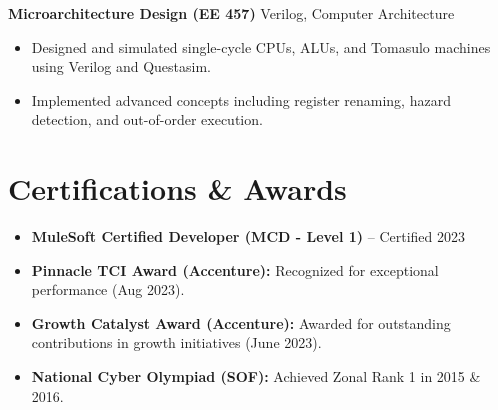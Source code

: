 \documentclass[letterpaper,10pt]{article}
\begin{document}
    \vspace{-2pt}
    \textbf{Microarchitecture Design (EE 457)} \hfill Verilog, Computer Architecture
    \begin{itemize}[leftmargin=*]
        \item Designed and simulated single-cycle CPUs, ALUs, and Tomasulo machines using Verilog and Questasim.
        \item Implemented advanced concepts including register renaming, hazard detection, and out-of-order execution.
    \end{itemize}

\section*{Certifications \& Awards}
    \begin{itemize}[leftmargin=*] \itemsep -2pt
        \item \textbf{MuleSoft Certified Developer (MCD - Level 1)} -- Certified 2023
        \item \textbf{Pinnacle TCI Award (Accenture):} Recognized for exceptional performance (Aug 2023).
        \item \textbf{Growth Catalyst Award (Accenture):} Awarded for outstanding contributions in growth initiatives (June 2023).
        \item \textbf{National Cyber Olympiad (SOF):} Achieved Zonal Rank 1 in 2015 \& 2016.
    \end{itemize}
\end{document}

